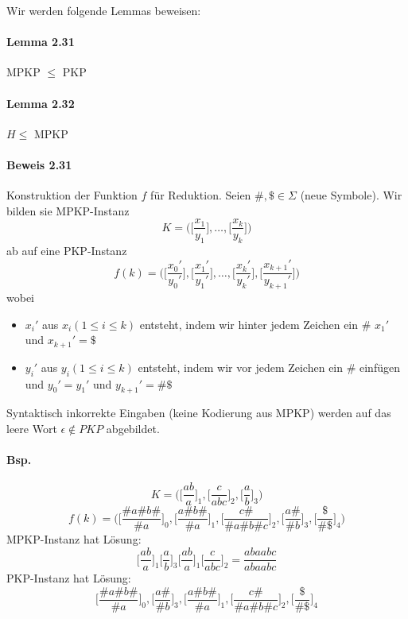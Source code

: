 \par\medskip Wir werden folgende Lemmas beweisen:

\paragraph*{Lemma 2.31} MPKP $\leq$ PKP

\paragraph*{Lemma 2.32} $H \leq$ MPKP

\paragraph*{Beweis 2.31} Konstruktion der Funktion $f$ für Reduktion. Seien $\#,\$ \in \Sigma$ (neue Symbole). Wir bilden sie MPKP-Instanz $$ K=\Bigg( \Bigg[ \frac{x_1}{y_1} \Bigg], \dots, \Bigg[ \frac{x_k}{y_k} \Bigg]\Bigg) $$ ab auf eine PKP-Instanz $$ f(k)=\Bigg( \Bigg[ \frac{x_0'}{y_0'} \Bigg], \Bigg[ \frac{x_1'}{y_1'} \Bigg], \dots, \Bigg[ \frac{x_k'}{y_k'} \Bigg], \Bigg[ \frac{x_{k+1}'}{y_{k+1}'} \Bigg] \Bigg) $$ wobei
\begin{itemize}
	\item $x_i'$ aus $x_i (1 \leq i \leq k)$ entsteht, indem wir hinter jedem Zeichen ein \# $x_1'$ und $x_{k+1}'=\$$
	\item $y_i'$ aus $y_i (1 \leq i \leq k)$ entsteht, indem wir vor jedem Zeichen ein \# einfügen und $y_0'=y_1'$ und $y_{k+1}'=\#\$$
\end{itemize}
Syntaktisch inkorrekte Eingaben (keine Kodierung aus MPKP) werden auf das leere Wort $\epsilon \not\in PKP$ abgebildet.

\paragraph*{Bsp.} $$K=\Bigg( \Bigg[ \frac{ab}{a} \Bigg]_1, \Bigg[ \frac{c}{abc} \Bigg]_2, \Bigg[ \frac{a}{b} \Bigg]_3 \Bigg)$$ $$ f(k)=\Bigg( \Bigg[ \frac{\#a\#b\#}{\#a} \Bigg]_0, \Bigg[ \frac{a\#b\#}{\#a} \Bigg]_1, \Bigg[ \frac{c\#}{\#a\#b\#c} \Bigg]_2, \Bigg[ \frac{a\#}{\#b} \Bigg]_3, \Bigg[ \frac{\$}{\#\$} \Bigg]_4 \Bigg) $$
MPKP-Instanz hat Lösung:
$$ \Bigg[ \frac{ab}{a} \Bigg]_1 \Bigg[ \frac{a}{b} \Bigg]_3 \Bigg[ \frac{ab}{a} \Bigg]_1 \Bigg[ \frac{c}{abc} \Bigg]_2 = \frac{abaabc}{abaabc} $$
PKP-Instanz hat Lösung:
$$ \Bigg[\frac{\#a\#b\#}{\#a}  \Bigg]_0, \Bigg[\frac{a\#}{\#b}  \Bigg]_3, \Bigg[\frac{a\#b\#}{\#a}  \Bigg]_1, \Bigg[\frac{c\#}{\#a\#b\#c}  \Bigg]_2, \Bigg[\frac{\$}{\#\$}  \Bigg]_4 $$

